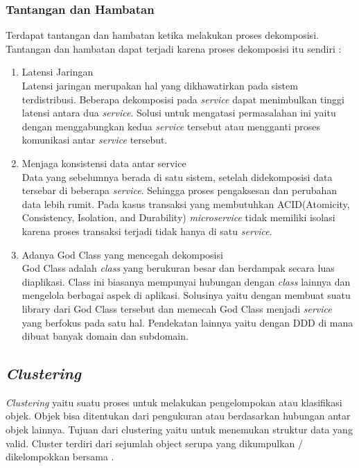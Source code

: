 \subsubsection{Tantangan dan Hambatan}
Terdapat tantangan dan hambatan ketika melakukan proses dekomposisi. Tantangan dan hambatan dapat terjadi karena proses dekomposisi itu sendiri \cite{1C7}:
\begin{enumerate}[leftmargin=1.3cm]
	\item Latensi Jaringan\\
		  Latensi jaringan merupakan hal yang dikhawatirkan pada sistem terdistribusi. Beberapa dekomposisi pada \textit{service} dapat menimbulkan tinggi latensi antara dua \textit{service}. Solusi untuk mengatasi permasalahan ini yaitu dengan menggabungkan kedua \textit{service} tersebut atau mengganti proses komunikasi antar \textit{service} tersebut.
	\item Menjaga konsistensi data antar service\\
		  Data yang sebelumnya berada di satu sistem, setelah didekomposisi data tersebar di beberapa \textit{service}. Sehingga proses pengaksesan dan perubahan data lebih rumit. Pada kasus transaksi yang membutuhkan ACID(Atomicity, Consistency, Isolation, and Durability) \textit{microservice} tidak memiliki isolasi karena proses transaksi terjadi tidak hanya di satu \textit{service}.
	\item Adanya God Class yang mencegah dekomposisi\\
		  God Class adalah \textit{class} yang berukuran besar dan berdampak secara luas diaplikasi. Class ini biasanya mempunyai hubungan dengan \textit{class} lainnya dan mengelola berbagai aspek di aplikasi. Solusinya yaitu dengan membuat suatu library dari God Class tersebut dan memecah God Class menjadi \textit{service} yang berfokus pada satu hal. Pendekatan lainnya yaitu dengan DDD di mana dibuat banyak domain dan subdomain.\\
\end{enumerate}	

\subsection{\textit{Clustering}}
\textit{Clustering} yaitu suatu proses untuk melakukan pengelompokan atau klasifikasi objek. Objek bisa ditentukan dari pengukuran atau berdasarkan hubungan antar objek lainnya. Tujuan dari clustering yaitu untuk  menemukan struktur data yang valid. Cluster terdiri dari sejumlah object serupa yang dikumpulkan / dikelompokkan bersama \cite{2C9}.

